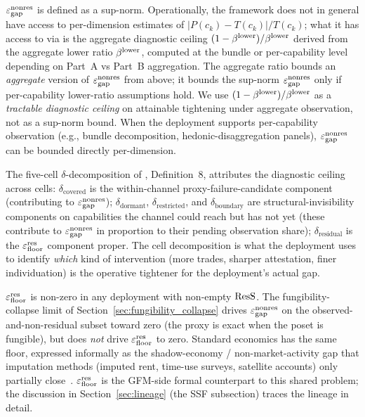 \begin{remark}
\label{rem:agg_vs_sup}
$\varepsilon_{\mathrm{gap}}^{\mathrm{nonres}}$ is defined as a sup-norm.  Operationally, the
framework does not in general have access to per-dimension
estimates of $|P(c_k) - T(c_k)|/T(c_k)$; what it has access to via
\citep[Theorem~2]{lasser2026paper8a} is the aggregate diagnostic
ceiling $(1 - \beta^{\mathrm{lower}})/\beta^{\mathrm{lower}}$ derived from the aggregate lower
ratio $\beta^{\mathrm{lower}}$, computed at the bundle or per-capability
level depending on Part~A vs Part~B aggregation.  The aggregate
ratio bounds an \emph{aggregate} version of $\varepsilon_{\mathrm{gap}}^{\mathrm{nonres}}$ from
above; it bounds the sup-norm $\varepsilon_{\mathrm{gap}}^{\mathrm{nonres}}$ only if per-capability
lower-ratio assumptions hold.  We use $(1 - \beta^{\mathrm{lower}})/\beta^{\mathrm{lower}}$ as a
\emph{tractable diagnostic ceiling} on attainable tightening
under aggregate observation, not as a sup-norm bound.  When the
deployment supports per-capability observation (e.g., bundle
decomposition, hedonic-disaggregation panels), $\varepsilon_{\mathrm{gap}}^{\mathrm{nonres}}$ can be
bounded directly per-dimension.
\end{remark}

\begin{remark}
\label{rem:cellwise_attribution}
The five-cell $\delta$-decomposition of
\citep[Need~Sufficiency]{lasser2026paper8b}, Definition~8,
attributes the diagnostic ceiling across cells:
$\delta_{\mathrm{covered}}$ is the within-channel
proxy-failure-candidate component (contributing to $\varepsilon_{\mathrm{gap}}^{\mathrm{nonres}}$);
$\delta_{\mathrm{dormant}}$, $\delta_{\mathrm{restricted}}$, and
$\delta_{\mathrm{boundary}}$ are structural-invisibility components
on capabilities the channel could reach but has not yet (these
contribute to $\varepsilon_{\mathrm{gap}}^{\mathrm{nonres}}$ in proportion to their pending
observation share); $\delta_{\mathrm{residual}}$ is the
$\varepsilon_{\mathrm{floor}}^{\mathrm{res}}$ component proper.  The cell decomposition is what the
deployment uses to identify \emph{which} kind of intervention
(more trades, sharper attestation, finer individuation) is the
operative tightener for the deployment's actual gap.
\end{remark}

\begin{remark}
\label{rem:floor_shared}
$\varepsilon_{\mathrm{floor}}^{\mathrm{res}}$ is non-zero in any deployment with non-empty $\mathrm{ResS}$.
The fungibility-collapse limit of
Section~\ref{sec:fungibility_collapse} drives $\varepsilon_{\mathrm{gap}}^{\mathrm{nonres}}$ on the
observed-and-non-residual subset toward zero (the proxy is exact
when the poset is fungible), but does \emph{not} drive $\varepsilon_{\mathrm{floor}}^{\mathrm{res}}$
to zero.  Standard economics has the same floor, expressed
informally as the shadow-economy / non-market-activity gap that
imputation methods (imputed rent, time-use surveys, satellite
accounts) only partially close~\citep{stiglitz2009report}.
$\varepsilon_{\mathrm{floor}}^{\mathrm{res}}$ is the GFM-side formal counterpart to this shared
problem; the discussion in Section~\ref{sec:lineage} (the SSF
subsection) traces the lineage in detail.
\end{remark}

